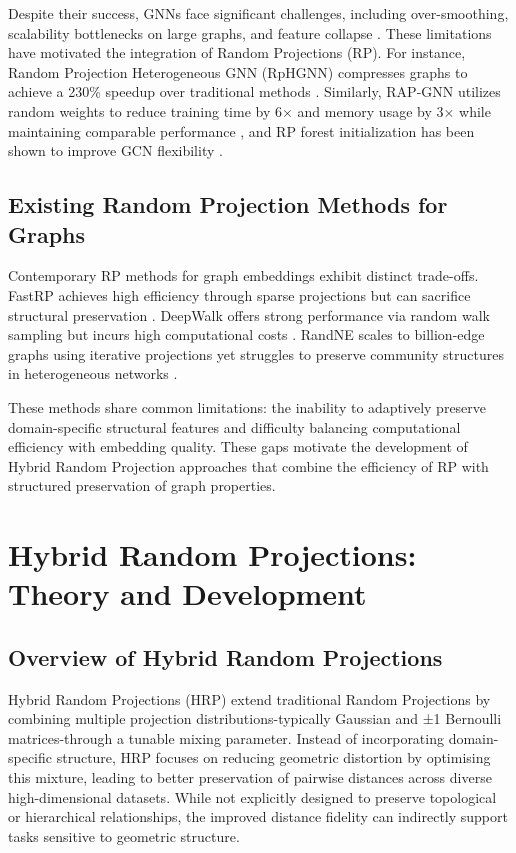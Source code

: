 \documentclass[conference]{IEEEtran}
\begin{document}
Despite their success, GNNs face significant challenges, including over-smoothing, scalability bottlenecks on large graphs, and feature collapse \cite{bui2023rap}. These limitations have motivated the integration of Random Projections (RP). For instance, Random Projection Heterogeneous GNN (RpHGNN) compresses graphs to achieve a 230\% speedup over traditional methods \cite{hu2021rphgnn}. Similarly, RAP-GNN utilizes random weights to reduce training time by 6$\times$ and memory usage by 3$\times$ while maintaining comparable performance \cite{bui2023rap}, and RP forest initialization has been shown to improve GCN flexibility \cite{alshammari2020rpforest}.

\subsection{Existing Random Projection Methods for Graphs}

Contemporary RP methods for graph embeddings exhibit distinct trade-offs. FastRP achieves high efficiency through sparse projections but can sacrifice structural preservation \cite{chen2019fast}. DeepWalk offers strong performance via random walk sampling but incurs high computational costs \cite{perozzi2014}. RandNE scales to billion-edge graphs using iterative projections yet struggles to preserve community structures in heterogeneous networks \cite{zhang2018randne}.

These methods share common limitations: the inability to adaptively preserve domain-specific structural features and difficulty balancing computational efficiency with embedding quality. These gaps motivate the development of Hybrid Random Projection approaches that combine the efficiency of RP with structured preservation of graph properties.


\section{Hybrid Random Projections: Theory and Development}

\subsection{Overview of Hybrid Random Projections}


Hybrid Random Projections (HRP)\cite{yahaya2025hrp} extend traditional Random Projections by combining multiple projection distributions-typically Gaussian and ±1 Bernoulli matrices-through a tunable mixing parameter. Instead of incorporating domain-specific structure, HRP focuses on reducing geometric distortion by optimising this mixture, leading to better preservation of pairwise distances across diverse high-dimensional datasets. While not explicitly designed to preserve topological or hierarchical relationships, the improved distance fidelity can indirectly support tasks sensitive to geometric structure.
\end{document}
